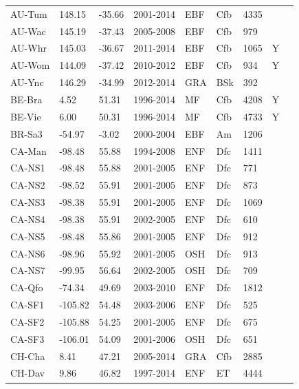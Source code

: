 \documentclass{myreport}
\begin{document}
\begin{longtable}{lllllllll}
  AU-Tum & 148.15 & -35.66 & 2001-2014 & EBF & Cfb & 4335 &  & \citet{AU-Tum} \\ 
  AU-Wac & 145.19 & -37.43 & 2005-2008 & EBF & Cfb & 979 &  & \citet{AU-Wac} \\ 
  AU-Whr & 145.03 & -36.67 & 2011-2014 & EBF & Cfb & 1065 & Y & \citet{AU-Whr} \\ 
  AU-Wom & 144.09 & -37.42 & 2010-2012 & EBF & Cfb & 934 & Y & \citet{AU-Wom} \\ 
  AU-Ync & 146.29 & -34.99 & 2012-2014 & GRA & BSk & 392 &  & \citet{AU-Ync} \\ 
  BE-Bra & 4.52 & 51.31 & 1996-2014 & MF & Cfb & 4208 & Y & \citet{BE-Bra} \\ 
  BE-Vie & 6.00 & 50.31 & 1996-2014 & MF & Cfb & 4733 & Y & \citet{BE-Vie} \\ 
  BR-Sa3 & -54.97 & -3.02 & 2000-2004 & EBF & Am & 1206 &  & \citet{BR-Sa3} \\ 
  CA-Man & -98.48 & 55.88 & 1994-2008 & ENF & Dfc & 1411 &  & \citet{CA-Man} \\ 
  CA-NS1 & -98.48 & 55.88 & 2001-2005 & ENF & Dfc & 771 &  & \citet{CA-NS1} \\ 
  CA-NS2 & -98.52 & 55.91 & 2001-2005 & ENF & Dfc & 873 &  & \citet{CA-NS2} \\ 
  CA-NS3 & -98.38 & 55.91 & 2001-2005 & ENF & Dfc & 1069 &  & \citet{CA-NS3} \\ 
  CA-NS4 & -98.38 & 55.91 & 2002-2005 & ENF & Dfc & 610 &  & \citet{CA-NS4} \\ 
  CA-NS5 & -98.48 & 55.86 & 2001-2005 & ENF & Dfc & 912 &  & \citet{CA-NS5} \\ 
  CA-NS6 & -98.96 & 55.92 & 2001-2005 & OSH & Dfc & 913 &  & \citet{CA-NS6} \\ 
  CA-NS7 & -99.95 & 56.64 & 2002-2005 & OSH & Dfc & 709 &  & \citet{CA-NS7} \\ 
  CA-Qfo & -74.34 & 49.69 & 2003-2010 & ENF & Dfc & 1812 &  & \citet{CA-Qfo} \\ 
  CA-SF1 & -105.82 & 54.48 & 2003-2006 & ENF & Dfc & 525 &  & \citet{CA-SF1} \\ 
  CA-SF2 & -105.88 & 54.25 & 2001-2005 & ENF & Dfc & 675 &  & \citet{CA-SF2} \\ 
  CA-SF3 & -106.01 & 54.09 & 2001-2006 & OSH & Dfc & 651 &  & \citet{CA-SF3} \\ 
  CH-Cha & 8.41 & 47.21 & 2005-2014 & GRA & Cfb & 2885 &  & \citet{CH-Cha} \\ 
  CH-Dav & 9.86 & 46.82 & 1997-2014 & ENF & ET & 4444 &  & \citet{CH-Dav} \\ 

\end{longtable}
\end{document}
